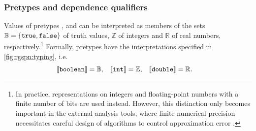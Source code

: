 \subsubsection{Pretypes and dependence qualifiers}

Values of pretypes ,  and  can be interpreted as members of the sets \(\mathbb{B} = \{\texttt{\upshape true}, \texttt{\upshape false}\}\) of truth values, \(\mathbb{Z}\) of integers and \(\mathbb{R}\) of real numbers, respectively.\footnote{In practice, representations on integers and floating-point numbers with a finite number of bits are used instead. However, this distinction only becomes important in the external analysis tools, where finite numerical precision necessitates careful design of algorithms to control approximation error .} Formally, pretypes have the interpretations specified in \vref{fig:rgspn:typing}, i.e.
\begin{align}
  \llbracket \texttt{\upshape boolean} \rrbracket &= \mathbb{B} \text,
  & \llbracket \texttt{\upshape int} \rrbracket &= \mathbb{Z} \text,
  & \llbracket \texttt{\upshape double} \rrbracket &= \mathbb{R} \text.
\end{align}

